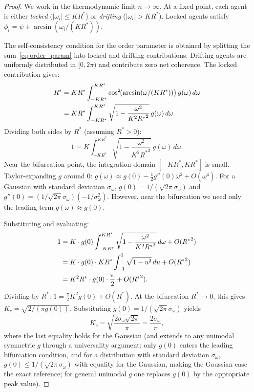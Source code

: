 \documentclass[twocolumn,10pt]{article}
\newcommand{\Kc}{K_c}
\newcommand{\sigmaomega}{\sigma_{\omega}}
\begin{document}
\begin{proof}
We work in the thermodynamic limit $n \to \infty$. At a fixed point, each
agent is either \emph{locked} ($|\omega_i| \leq K R^*$) or \emph{drifting}
($|\omega_i| > K R^*$). Locked agents satisfy $\phi_i = \psi +
\arcsin(\omega_i / (K R^*))$.

The self-consistency condition for the order parameter is obtained by splitting
the sum~\eqref{eq:order_param} into locked and drifting contributions. Drifting
agents are uniformly distributed in $[0, 2\pi)$ and contribute zero net
coherence. The locked contribution gives:
\begin{align}
R^* &= K R^* \int_{-KR^*}^{KR^*} \cos^2\!\bigl(\arcsin(\omega/(KR^*))\bigr)\,
       g(\omega)\, d\omega \notag \\
    &= K R^* \int_{-KR^*}^{KR^*}
       \sqrt{1 - \frac{\omega^2}{K^2 {R^*}^2}}\, g(\omega)\, d\omega.
\label{eq:self_consistency}
\end{align}
Dividing both sides by $R^*$ (assuming $R^* > 0$):
\begin{equation}
\label{eq:sc_div}
  1 = K \int_{-KR^*}^{KR^*} \sqrt{1 - \frac{\omega^2}{K^2{R^*}^2}}\,
      g(\omega)\, d\omega.
\end{equation}
Near the bifurcation point, the integration domain $[-KR^*, KR^*]$ is small.
Taylor-expanding $g$ around $0$: $g(\omega) \approx g(0) - \frac{1}{2}
g''(0)\omega^2 + O(\omega^4)$. For a Gaussian with standard deviation
$\sigmaomega$, $g(0) = 1/(\sqrt{2\pi}\sigmaomega)$ and
$g''(0) = (1/\sqrt{2\pi}\sigmaomega)(-1/\sigmaomega^2)$. However, near the
bifurcation we need only the leading term $g(\omega) \approx g(0)$.

Substituting and evaluating:
\begin{align}
  1 &= K \cdot g(0) \int_{-KR^*}^{KR^*}
       \sqrt{1 - \frac{\omega^2}{K^2{R^*}^2}}\, d\omega + O({R^*}^2) \notag \\
    &= K \cdot g(0) \cdot K R^* \int_{-1}^{1} \sqrt{1-u^2}\, du + O({R^*}^2)
       \notag \\
    &= K^2 R^* \cdot g(0) \cdot \frac{\pi}{2} + O({R^*}^2).
\end{align}
Dividing by $R^*$: $1 = \frac{\pi}{2} K^2 g(0) + O({R^*})$. At the
bifurcation $R^* \to 0$, this gives $K_c = \sqrt{2/(\pi g(0))}$. Substituting
$g(0) = 1/(\sqrt{2\pi}\sigmaomega)$ yields
\[
  \Kc = \sqrt{\frac{2\sigmaomega\sqrt{2\pi}}{\pi}} = \frac{2\sigmaomega}{\pi},
\]
where the last equality holds for the Gaussian (and extends to any unimodal
symmetric $g$ through a universality argument: only $g(0)$ enters the leading
bifurcation condition, and for a distribution with standard deviation
$\sigmaomega$, $g(0) \leq 1/(\sqrt{2\pi}\sigmaomega)$ with equality for the
Gaussian, making the Gaussian case the exact reference; for general unimodal
$g$ one replaces $g(0)$ by the appropriate peak value).


\end{proof}
\end{document}
